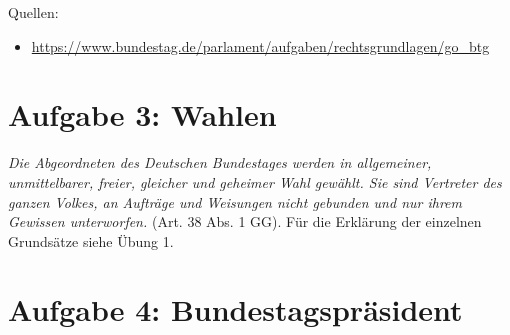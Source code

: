 \documentclass{article}
\begin{document}
	Quellen:
	\begin{itemize}
		\item \url{https://www.bundestag.de/parlament/aufgaben/rechtsgrundlagen/go_btg}
	\end{itemize}

	\section*{Aufgabe 3: Wahlen}
	\textit{Die Abgeordneten des Deutschen Bundestages werden in allgemeiner, unmittelbarer, freier, gleicher und geheimer Wahl gewählt. Sie sind Vertreter des ganzen Volkes, an Aufträge und Weisungen nicht gebunden und nur ihrem Gewissen unterworfen.} (Art. 38 Abs. 1 GG). Für die Erklärung der einzelnen Grundsätze siehe Übung 1.
	
	\section*{Aufgabe 4: Bundestagspräsident}
\end{document}
